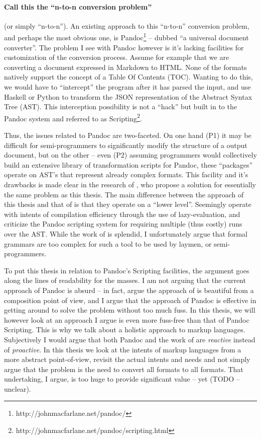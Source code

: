 \documentclass{scrreprt}
\begin{document}
\paragraph{Call this the ``n-to-n conversion problem''} (or simply ``n-to-n''). An existing approach to this ``n-to-n'' conversion problem, and perhaps the most obvious one, is Pandoc\footnote{http://johnmacfarlane.net/pandoc/} -- dubbed ``a universal document converter''. The problem I see with Pandoc however is it's lacking facilities for customization of the conversion process. Assume for example that we are converting a document expressed in Markdown to HTML. None of the formats natively support the concept of a Table Of Contents (TOC). Wanting to do this, we would have to ``intercept'' the program after it has parsed the input, and use Haskell or Python to transform the JSON representation of the Abstract Syntax Tree (AST). This interception possibility is not a ``hack'' but built in to the Pandoc system and referred to as Scripting\footnote{http://johnmacfarlane.net/pandoc/scripting.html}.

Thus, the issues related to Pandoc are two-faceted. On one hand (P1) it may be difficult for semi-programmers to significantly modify the structure of a output document, but on the other -- even (P2) assuming programmers would collectively build an extensive library of transformation scripts for Pandoc, these ``packages'' operate on AST's that represent already complex formats. This facility and it's drawbacks is made clear in the research of \citet{krijnen}, who propose a solution for essentially the same problem as this thesis. The main difference between the approach of this thesis and that of \citet{krijnen} is that they operate on a ``lower level''. Seemingly \citet{krijnen} operate with intents of compilation efficiency through the use of lazy-evaluation, and criticize the Pandoc scripting system for requiring multiple (thus costly) runs over the AST. While the work of \citet{krijnen} is splendid, I unfortunately argue that formal grammars are too complex for such a tool to be used by laymen, or semi-programmers.

To put this thesis in relation to Pandoc's Scripting facilities, the argument goes along the lines of readability for the masses. I am not arguing that the current approach of Pandoc is absurd -- in fact, argue the approach of \citet{krijnen} is beautiful from a composition point of view, and I argue that the approach of Pandoc is effective in getting around to solve the problem without too much fuss. In this thesis, we will however look at an approach I argue is even more fuss-free than that of Pandoc Scripting. This is why we talk about a holistic approach to markup languages. Subjectively I would argue that both Pandoc and the work of \citet{krijnen} are \emph{reactive} instead of \emph{proactive}. In this thesis we look at the intents of markup languages from a more abstract point-of-view, revisit the actual intents and needs and not simply argue that the problem is the need to convert all formats to all formats. That undertaking, I argue, is too huge to provide significant value -- yet (TODO -- unclear).
\end{document}
